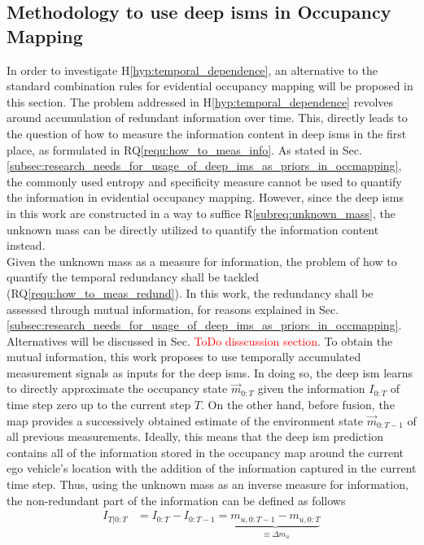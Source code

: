 \subsection{Methodology to use deep \gls{ism}s in Occupancy Mapping}
\label{subsec:method_to_use_deep_isms_in_occmaps}
In order to investigate H\ref{hyp:temporal_dependence}, an alternative to the standard combination rules for evidential occupancy mapping will be proposed in this section. The problem addressed in H\ref{hyp:temporal_dependence} revolves around accumulation of redundant information over time. This, directly leads to the question of how to measure the information content in deep \gls{ism}s in the first place, as formulated in RQ\ref{requ:how_to_meas_info}. As stated in Sec. \ref{subsec:research_needs_for_usage_of_deep_ims_as_priors_in_occmapping}, the commonly used entropy and specificity measure cannot be used to quantify the information in evidential occupancy mapping. However, since the deep \gls{ism}s in this work are constructed in a way to suffice R\ref{subreq:unknown_mass}, the unknown mass can be directly utilized to quantify the information content instead.\\
Given the unknown mass as a measure for information, the problem of how to quantify the temporal redundancy shall be tackled (RQ\ref{requ:how_to_meas_redund}). In this work, the redundancy shall be assessed through mutual information, for reasons explained in Sec. \ref{subsec:research_needs_for_usage_of_deep_ims_as_priors_in_occmapping}. Alternatives will be discussed in Sec. \textcolor{red}{ToDo disscussion section}. To obtain the mutual information, this work proposes to use temporally accumulated measurement signals as inputs for the deep \gls{ism}s. In doing so, the deep \gls{ism} learns to directly approximate the occupancy state $\vec{m}_{0:T}$ given the information $I_{0:T}$ of time step zero up to the current step $T$. On the other hand, before fusion, the map provides a successively obtained estimate of the environment state $\vec{m}_{0:T-1}$ of all previous measurements. Ideally, this means that the deep \gls{ism} prediction contains all of the information stored in the occupancy map around the current ego vehicle's location with the addition of the information captured in the current time step. Thus, using the unknown mass as an inverse measure for information, the non-redundant part of the information can be defined as follows
\begin{align}
	\label{eq:non_redund_info}
	I_{T|0:T} &= I_{0:T} - I_{0:T-1} = \underbrace{m_{u,0:T-1} - m_{u,0:T}}_{\equiv\Delta m_{u}}
\end{align}
